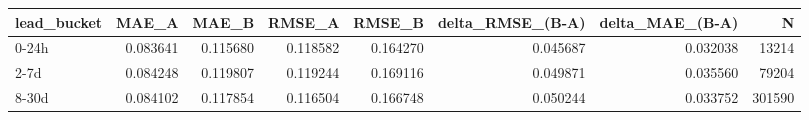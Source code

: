 \begin{tabular}{lrrrrrrr}
\toprule
lead_bucket & MAE_A & MAE_B & RMSE_A & RMSE_B & delta_RMSE_(B-A) & delta_MAE_(B-A) & N \\
\midrule
0-24h & 0.083641 & 0.115680 & 0.118582 & 0.164270 & 0.045687 & 0.032038 & 13214 \\
2-7d & 0.084248 & 0.119807 & 0.119244 & 0.169116 & 0.049871 & 0.035560 & 79204 \\
8-30d & 0.084102 & 0.117854 & 0.116504 & 0.166748 & 0.050244 & 0.033752 & 301590 \\
\bottomrule
\end{tabular}
